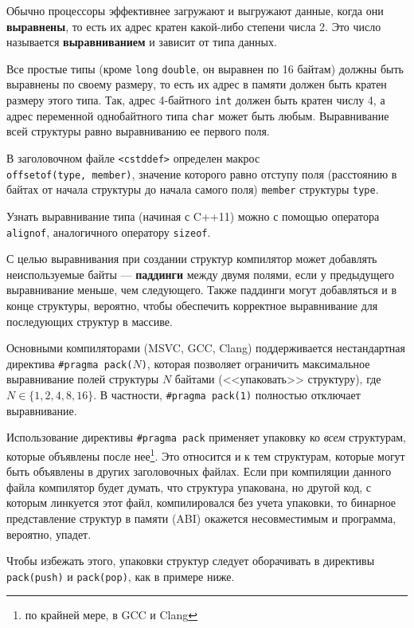 Обычно процессоры эффективнее загружают и выгружают данные, когда они \textbf{выравнены},
то есть их адрес кратен какой-либо степени числа 2. Это число называется \textbf{выравниванием}
и зависит от типа данных.

Все простые типы (кроме \verb|long| \verb|double|,
он выравнен по 16 байтам) должны быть выравнены по своему размеру,
то есть их адрес в памяти должен быть кратен размеру этого типа.
Так, адрес 4-байтного \verb|int| должен быть кратен числу 4, а адрес переменной
однобайтного типа \verb|char| может быть любым.
Выравнивание всей структуры равно выравниванию ее первого поля.

В заголовочном файле \verb|<cstddef>| определен макрос\\ \verb|offsetof(type, member)|,
значение которого равно отступу поля (расстоянию в байтах от начала структуры до начала
самого поля) \verb|member| структуры \verb|type|.

Узнать выравнивание типа (начиная с C++11) можно с помощью
оператора \verb|alignof|, аналогичного оператору \verb|sizeof|.

С целью выравнивания при создании структур компилятор может добавлять
неиспользуемые байты --- \textbf{паддинги} между двумя полями,
если у предыдущего выравнивание меньше, чем следующего. Также паддинги
могут добавляться и в конце структуры, вероятно, чтобы обеспечить корректное
выравнивание для последующих структур в массиве.

Основными компиляторами (MSVC, GCC, Clang) поддерживается нестандартная директива
\verb|#pragma pack(|$N$\verb|)|, которая позволяет ограничить максимальное
выравнивание полей структуры $N$ байтами (<<упаковать>> структуру), где $N \in \{1,2,4,8,16\}$.
В частности, \verb|#pragma pack(1)| полностью отключает выравнивание.

Использование директивы \verb|#pragma pack|
применяет упаковку ко \textit{всем} структурам, которые объявлены после нее\footnote{по крайней мере, в GCC и Clang}.
Это относится и к тем структурам, которые могут быть объявлены в других заголовочных файлах.
Если при компиляции данного файла компилятор будет думать, что структура упакована,
но другой код, с которым линкуется этот файл, компилировался без учета упаковки,
то бинарное представление структур в памяти (ABI) окажется несовместимым и
программа, вероятно, упадет.

Чтобы избежать этого, упаковки структур следует оборачивать в директивы
\verb|pack(push)| и \verb|pack(pop)|, как в примере ниже.


